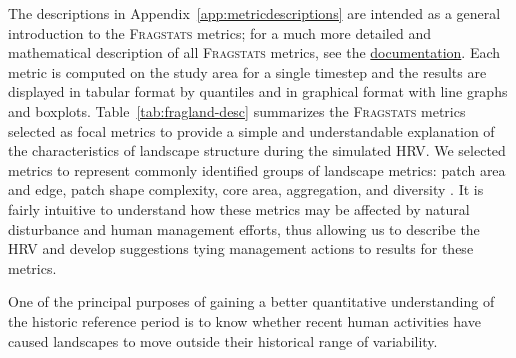 The descriptions in Appendix~\ref{app:metricdescriptions} are intended as a general introduction to the \textsc{Fragstats} metrics; for a much more detailed and mathematical description of all \textsc{Fragstats} metrics, see the \href{http://www.umass.edu/landeco/research/fragstats/documents/fragstats.help.4.2.pdf}{documentation}. Each metric is computed on the study area for a single timestep and the results are displayed in tabular format by quantiles and in graphical format with line graphs and boxplots. Table~\ref{tab:fragland-desc} summarizes the \textsc{Fragstats} metrics selected as focal metrics to provide a simple and understandable explanation of the characteristics of landscape structure during the simulated HRV. We selected metrics to represent commonly identified groups of landscape metrics: patch area and edge, patch shape complexity, core area, aggregation, and diversity \citep{McGarigal2015}. It is fairly intuitive to understand how these metrics may be affected by natural disturbance and human management efforts, thus allowing us to describe the HRV and develop suggestions tying management actions to results for these metrics.

One of the principal purposes of gaining a better quantitative understanding of the historic reference period is to know whether recent human activities have caused landscapes to move outside their historical range of variability. 


